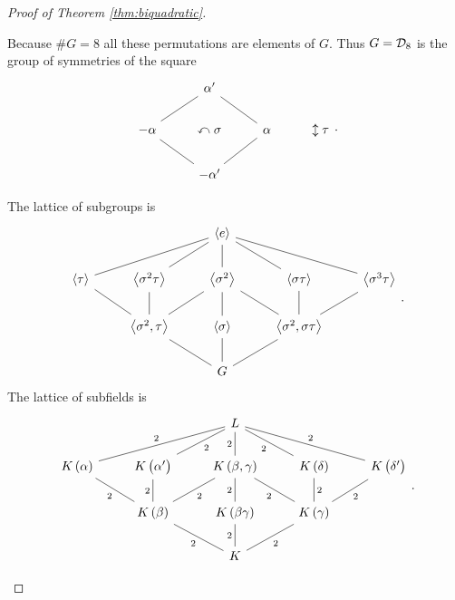 \begin{proof}[Proof of Theorem \ref{thm:biquadratic}]
\begin{enumerate}
\begin{itemize}
\end{itemize}
Because $ \#G = 8 $ all these permutations are elements of $ G $. Thus $ G = \mathcal{D}_8 $ is the group of symmetries of the square
$$
\begin{tikzcd}
& \alpha' & & \\
-\alpha \arrow[dash]{ur} & \curvearrowleft \sigma & \alpha \arrow[dash]{ul} & \updownarrow \tau \\
& -\alpha' \arrow[dash]{ul} \arrow[dash]{ur} & &
\end{tikzcd}.
$$

\pagebreak

The lattice of subgroups is
$$
\begin{tikzcd}
& & \abr{e} & & \\
\abr{\tau} \arrow[dash]{urr} & \abr{\sigma^2\tau} \arrow[dash]{ur} & \abr{\sigma^2} \arrow[dash]{u} & \abr{\sigma\tau} \arrow[dash]{ul} & \abr{\sigma^3\tau} \arrow[dash]{ull} \\
& \abr{\sigma^2, \tau} \arrow[dash]{ul} \arrow[dash]{u} \arrow[dash]{ur} & \abr{\sigma} \arrow[dash]{u} & \abr{\sigma^2, \sigma\tau} \arrow[dash]{ul} \arrow[dash]{u} \arrow[dash]{ur} & \\
& & G \arrow[dash]{ul} \arrow[dash]{u} \arrow[dash]{ur} & &
\end{tikzcd}.
$$
The lattice of subfields is
$$
\begin{tikzcd}
& & L & & \\
K\br{\alpha} \arrow[dash]{urr}{2} & K\br{\alpha'} \arrow[dash, swap]{ur}{2} & K\br{\beta, \gamma} \arrow[dash]{u}{2} & K\br{\delta} \arrow[dash]{ul}{2} & K\br{\delta'} \arrow[dash, swap]{ull}{2} \\
& K\br{\beta} \arrow[dash]{ul}{2} \arrow[dash]{u}{2} \arrow[dash, swap]{ur}{2} & K\br{\beta\gamma} \arrow[dash]{u}{2} & K\br{\gamma} \arrow[dash]{ul}{2} \arrow[dash, swap]{u}{2} \arrow[dash, swap]{ur}{2} & \\
& & K \arrow[dash]{ul}{2} \arrow[dash]{u}{2} \arrow[dash, swap]{ur}{2} & &
\end{tikzcd}.
$$



\end{enumerate}
\end{proof}
